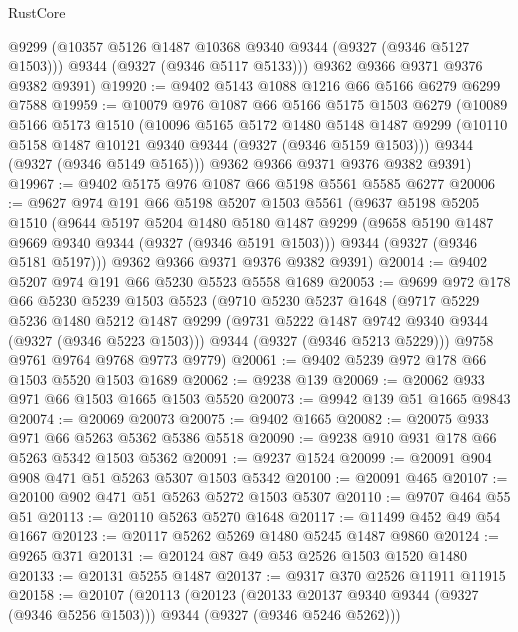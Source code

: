 \begin{lexlean}{RustCore}
\begin{coremodule}
        @9299
        (@10357 @5126 @1487 @10368 @9340 @9344 (@9327 (@9346 @5127 @1503)))
        @9344
        (@9327 (@9346 @5117 @5133)))
      @9362
      @9366
      @9371
      @9376
      @9382
      @9391)
@19920 := @9402 @5143 @1088 @1216 @66 @5166 @6279 @6299 @7588
@19959 := @10079
    @976
    @1087
    @66
    @5166
    @5175
    @1503
    @6279
    (@10089
      @5166
      @5173
      @1510
      (@10096
        @5165
        @5172
        @1480
        @5148
        @1487
        @9299
        (@10110 @5158 @1487 @10121 @9340 @9344 (@9327 (@9346 @5159 @1503)))
        @9344
        (@9327 (@9346 @5149 @5165)))
      @9362
      @9366
      @9371
      @9376
      @9382
      @9391)
@19967 := @9402 @5175 @976 @1087 @66 @5198 @5561 @5585 @6277
@20006 := @9627
    @974
    @191
    @66
    @5198
    @5207
    @1503
    @5561
    (@9637
      @5198
      @5205
      @1510
      (@9644
        @5197
        @5204
        @1480
        @5180
        @1487
        @9299
        (@9658 @5190 @1487 @9669 @9340 @9344 (@9327 (@9346 @5191 @1503)))
        @9344
        (@9327 (@9346 @5181 @5197)))
      @9362
      @9366
      @9371
      @9376
      @9382
      @9391)
@20014 := @9402 @5207 @974 @191 @66 @5230 @5523 @5558 @1689
@20053 := @9699
    @972
    @178
    @66
    @5230
    @5239
    @1503
    @5523
    (@9710
      @5230
      @5237
      @1648
      (@9717
        @5229
        @5236
        @1480
        @5212
        @1487
        @9299
        (@9731 @5222 @1487 @9742 @9340 @9344 (@9327 (@9346 @5223 @1503)))
        @9344
        (@9327 (@9346 @5213 @5229)))
      @9758
      @9761
      @9764
      @9768
      @9773
      @9779)
@20061 := @9402 @5239 @972 @178 @66 @1503 @5520 @1503 @1689
@20062 := @9238 @139
@20069 := @20062 @933 @971 @66 @1503 @1665 @1503 @5520
@20073 := @9942 @139 @51 @1665 @9843
@20074 := @20069 @20073
@20075 := @9402 @1665
@20082 := @20075 @933 @971 @66 @5263 @5362 @5386 @5518
@20090 := @9238 @910 @931 @178 @66 @5263 @5342 @1503 @5362
@20091 := @9237 @1524
@20099 := @20091 @904 @908 @471 @51 @5263 @5307 @1503 @5342
@20100 := @20091 @465
@20107 := @20100 @902 @471 @51 @5263 @5272 @1503 @5307
@20110 := @9707 @464 @55 @51
@20113 := @20110 @5263 @5270 @1648
@20117 := @11499 @452 @49 @54 @1667
@20123 := @20117 @5262 @5269 @1480 @5245 @1487 @9860
@20124 := @9265 @371
@20131 := @20124 @87 @49 @53 @2526 @1503 @1520 @1480
@20133 := @20131 @5255 @1487
@20137 := @9317 @370 @2526 @11911 @11915
@20158 := @20107
    (@20113
      (@20123
        (@20133 @20137 @9340 @9344 (@9327 (@9346 @5256 @1503)))
        @9344
        (@9327 (@9346 @5246 @5262)))

\end{coremodule}
\end{lexlean}
